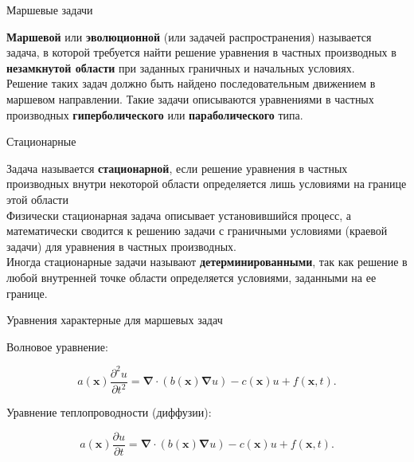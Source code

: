\documentclass[10pt,xcolor=pst,aspectratio=169]{beamer}
\begin{document}
\begin{frame}{Маршевые задачи}

    \transdissolve[duration=0.1]
    \justifying
    \large

    \textbf{Маршевой} или \textbf{эволюционной} (или задачей распространения) называется задача, в которой требуется найти решение уравнения в частных производных в \textbf{незамкнутой области} при заданных граничных и начальных условиях.\\

    Решение таких задач должно быть найдено последовательным движением в маршевом направлении. Такие задачи описываются уравнениями в частных производных \textbf{гиперболического} или \textbf{параболического} типа.

\end{frame}

\begin{frame}{Стационарные}

    \transdissolve[duration=0.1]
    \justifying
    \large

    Задача называется \textbf{стационарной}, если решение уравнения в частных производных внутри некоторой области определяется лишь условиями на границе этой области\\

    Физически стационарная задача описывает установившийся процесс, а математически сводится к решению задачи с граничными условиями (краевой задачи) для уравнения в частных производных.\\

    Иногда стационарные задачи называют \textbf{детерминированными}, так как решение в любой внутренней точке области определяется условиями, заданными на ее границе.

\end{frame}

\begin{frame}{Уравнения характерные для маршевых задач}

    \transdissolve[duration=0.1]
    \justifying
    \large

    Волновое уравнение:

    \[
        a(\mathbf{x}) \frac{\partial^{2} u}{\partial t^{2}} = \bm{\nabla} \cdot \left( b(\mathbf{x}) \bm{\nabla} u \right) - c(\mathbf{x}) u + f(\mathbf{x}, t).
    \]

    Уравнение теплопроводности (диффузии):

    \[
        a(\mathbf{x}) \frac{\partial u}{\partial t} = \bm{\nabla} \cdot \left( b(\mathbf{x}) \bm{\nabla} u \right) - c(\mathbf{x}) u + f(\mathbf{x}, t).
    \]

\end{frame}
\end{document}
